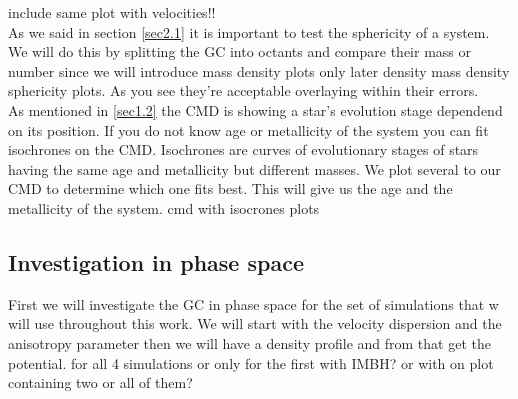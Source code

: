 \color{red} include same plot with velocities!! \color{black}\\
As we said in section \ref{sec2.1} it is important to test the sphericity of a system. We will do this by splitting the \ac{GC} into octants and compare their mass \color{red} or number since we will introduce mass density plots only later \color{black} density \color{red} mass density sphericity plots\color{black}. As you see they're acceptable overlaying \color{red} within their errors. \color{black}
\\
As mentioned in \ref{sec1.2} the \ac{CMD} is showing a star's evolution stage dependend on its position. If you do not know age or metallicity of the system you can fit isochrones on the \ac{CMD}. Isochrones are curves of evolutionary stages of stars having the same age and metallicity but different masses. We plot several to our \ac{CMD} to determine which one fits best. This will give us the age and the metallicity of the system. \color{red} cmd with isocrones plots \color{black}


\subsection{Investigation in phase space}

First we will investigate the \ac{GC} in phase space for the set of simulations that w will use throughout this work. We will start with the velocity dispersion and the anisotropy parameter then we will have a density profile and from that get the potential. \color{red} for all 4 simulations or only for the first with IMBH? or with on plot containing two or all of them? \color{black}

